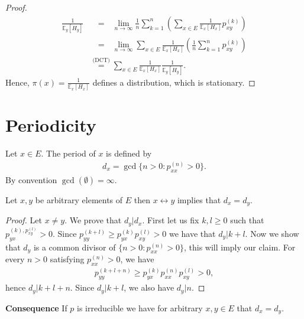 \begin{proof}
\begin{align}
	\frac{1}{\mathbb{E}_{y} \left[ H_y \right] } &\stackrel{\phantom{\textrm{(DCT)}}}{=} \lim_{n \to \infty } \frac{1}{n} \sum_{k=1}^{n}  \left( \sum_{x \in E}^{} \frac{1}{\mathbb{E}_{x} \left[ H_x \right] } p_{xy}^{(k)} \right) \\
						     &\stackrel{\phantom{\textrm{(DCT)}}}{=} \lim_{n \to \infty }\sum_{x \in E}^{} \frac{1}{\mathbb{E}_{x} \left[ H_x \right] } \left( \frac{1}{n} \sum_{k=1}^{n} p_{xy}^{(k)} \right) \\
						     &\stackrel{\textrm{(DCT)}}{=} \sum_{x \in E}^{} \frac{1}{\mathbb{E}_{x} \left[ H_x \right] } \frac{1}{\mathbb{E}_{y} \left[ H_y \right] }
.\end{align}
Hence, $\pi(x) = \frac{1}{\mathbb{E}_{x} \left[ H_x \right] } $ defines a distribution, which is stationary.
\end{proof}


\section{Periodicity}
\begin{defn}
	Let $x \in E$. The period of $x$ is defined by
	\begin{align}
	\boxed{d_x = \gcd\{n> 0: p_{xx}^{(n)}>0\} }
	.\end{align}
	By convention $\gcd(\emptyset)=\infty$.	
\end{defn}

\begin{prop}[]
	Let $x,y$ be arbitrary elements of $ E$ then $ x \leftrightarrow y$ implies that $d_x=d_y$.
\end{prop}
\begin{proof}
	Let $x\neq y$. We prove that $d_y | d_x$. First let us fix $k,l\geq 0$ such that $p_{yx}^{(k), p_{xy}^{(l)}}> 0$. Since $p_{yy}^{(k+l)}\geq p_{yx}^{(k)}p_{xy}^{(l)}> 0$ we have that $d_y | k+l$. Now we show that $d_y$ is a common divisor of $\{n> 0: p_{xx}^{(n)}> 0\}$, this will imply our claim. For every $n> 0$ satisfying $p_{xx}^{(n)}>0$, we have 
	\begin{align}
		p_{yy}^{(k+l+n)} \geq p_{yx}^{(k)}p_{xx}^{(n)}p_{xy}^{(l)} > 0,
	\end{align}
hence $d_y | k+l+n$. Since $d_y | k+l$, we also have $d_y|n$.	
\end{proof}


\textbf{Consequence} If $p$ is irreducible we have for arbitrary $x,y \in E$ that $d_x = d_y$.

